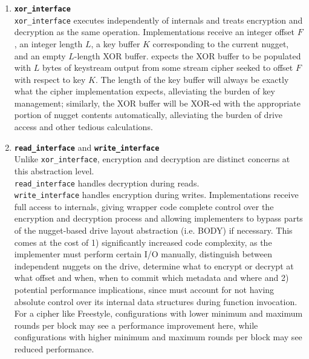 \begin{enumerate}
   \item \textbf{\texttt{xor\_interface}}\\\texttt{xor\_interface} executes
   independently of \sys internals and treats encryption and decryption
   as the same operation. Implementations receive an integer offset $F$, an
   integer length $L$, a key buffer $K$ corresponding to the current nugget, and
   an empty $L$-length XOR buffer. \sys expects the XOR buffer to be
   populated with $L$ bytes of keystream output from some stream cipher seeked
   to offset $F$ with respect to key $K$. The length of the key buffer will
   always be exactly what the cipher implementation expects, alleviating the
   burden of key management; similarly, the XOR buffer will be XOR-ed with the
   appropriate portion of nugget contents automatically, alleviating the burden
   of drive access and other tedious calculations. \\
 \item \textbf{\texttt{read\_interface}} and
   \textbf{\texttt{write\_interface}}\\
   Unlike \texttt{xor\_interface}, encryption and decryption are
   distinct concerns at this abstraction level.
   \\\texttt{read\_interface} handles decryption during reads.
   \\\texttt{write\_interface} handles encryption during writes.
   Implementations receive full access to \sys internals,
   giving wrapper code complete control over the encryption and
   decryption process and allowing implementers to bypass parts of the
   nugget-based drive layout abstraction (i.e. BODY) if necessary.
   This comes at the cost of 1) significantly increased code
   complexity, as the implementer 
   must perform certain I/O manually, distinguish between independent
   nuggets on the drive, determine what to encrypt or decrypt at what
   offset and when, when to commit which metadata and where and 2)
   potential performance implications, since \sys must account
   for not having absolute control over its internal data structures
   during function invocation. For a cipher like Freestyle,
   configurations with lower minimum and maximum rounds per block may
   see a performance improvement here, while configurations with
   higher minimum and maximum rounds per block may see reduced
   performance.
\end{enumerate}


